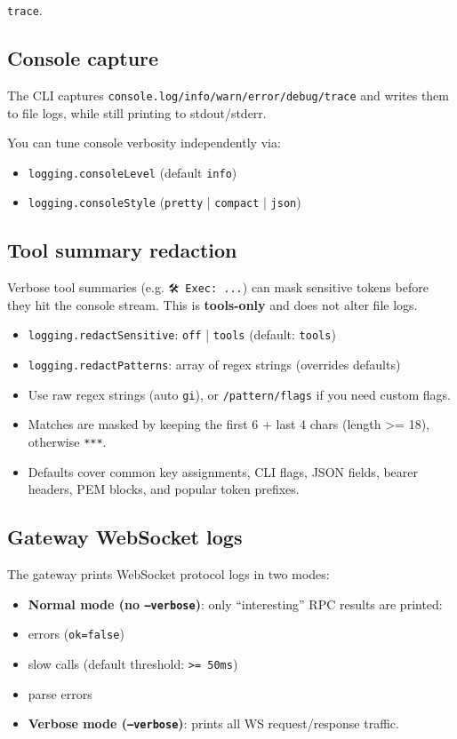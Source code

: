 \texttt{trace}.

\subsection{Console capture}


The CLI captures \texttt{console.log/info/warn/error/debug/trace} and writes them to file logs,
while still printing to stdout/stderr.

You can tune console verbosity independently via:

\begin{itemize}
  \item \texttt{logging.consoleLevel} (default \texttt{info})
  \item \texttt{logging.consoleStyle} (\texttt{pretty} | \texttt{compact} | \texttt{json})
\end{itemize}


\subsection{Tool summary redaction}


Verbose tool summaries (e.g. \texttt{🛠️ Exec: ...}) can mask sensitive tokens before they hit the
console stream. This is \textbf{tools-only} and does not alter file logs.

\begin{itemize}
  \item \texttt{logging.redactSensitive}: \texttt{off} | \texttt{tools} (default: \texttt{tools})
  \item \texttt{logging.redactPatterns}: array of regex strings (overrides defaults)
  \item Use raw regex strings (auto \texttt{gi}), or \texttt{/pattern/flags} if you need custom flags.
  \item Matches are masked by keeping the first 6 + last 4 chars (length >= 18), otherwise \texttt{***}.
  \item Defaults cover common key assignments, CLI flags, JSON fields, bearer headers, PEM blocks, and popular token prefixes.
\end{itemize}


\subsection{Gateway WebSocket logs}


The gateway prints WebSocket protocol logs in two modes:

\begin{itemize}
  \item \textbf{Normal mode (no \texttt{--verbose})}: only “interesting” RPC results are printed:
  \item errors (\texttt{ok=false})
  \item slow calls (default threshold: \texttt{>= 50ms})
  \item parse errors
  \item \textbf{Verbose mode (\texttt{--verbose})}: prints all WS request/response traffic.
\end{itemize}


